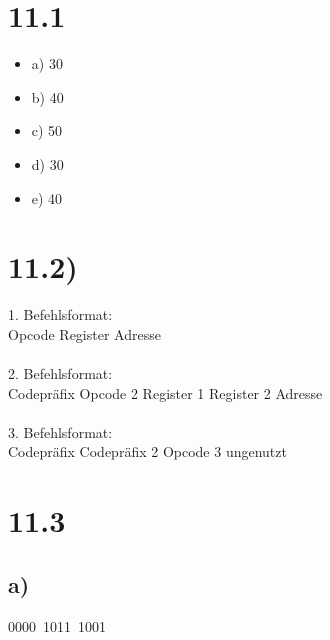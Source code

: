 \documentclass[a4paper]{scrartcl}
\title{\titleinfo}
\author{Tronje Krabbe 6435002, The-Vinh Jackie Huynh 6388888,\\Arne Struck 6326505}
\date{\today}
\begin{document}
\maketitle

\section{11.1}
	\begin{itemize}
		\item a) 30
		\item b) 40
		\item c) 50
		\item d) 30
		\item e) 40
	\end{itemize}

\section{11.2)}
	1. Befehlsformat: \\
	Opcode \hspace{1,3cm} Register \hspace{4,9cm} Adresse
\\
\\
2. Befehlsformat: \\
Codepräfix \hspace{0,9cm} Opcode 2 \hspace{1,4cm} Register 1 \hspace{1cm} Register 2 \hspace{1,2cm} Adresse
\\
\\
3. Befehlsformat: \\
Codepräfix \hspace{0.7cm} Codepräfix 2 \hspace{0,8cm} Opcode 3\hspace{3cm} ungenutzt 

\newpage
\section{11.3}
	\subsection{a)} 0000\ 1011\ 1001
	
\end{document}
